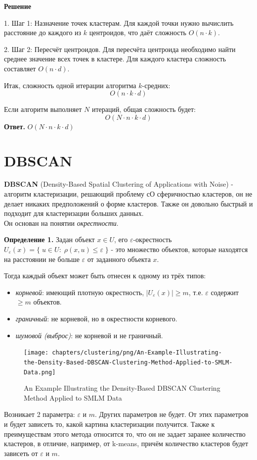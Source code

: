 \textbf{Решение}

1. Шаг 1: Назначение точек кластерам.
   Для каждой точки нужно вычислить расстояние до каждого из \(k\) центроидов, что даёт сложность \(O(n \cdot k)\).

2. Шаг 2: Пересчёт центроидов.
   Для пересчёта центроида необходимо найти среднее значение всех точек в кластере. Для каждого кластера сложность составляет \(O(n \cdot d)\).

Итак, сложность одной итерации алгоритма \(k\)-средних: 
\[
O(n \cdot k \cdot d)
\]

Если алгоритм выполняет \(N\) итераций, общая сложность будет:
\[
O(N \cdot n \cdot k \cdot d)
\]
\textbf{Ответ.} $O(N \cdot n \cdot k \cdot d)$


\section{DBSCAN}

\textbf{DBSCAN} (Density-Based Spatial Clustering of Applications with Noise) - алгоритм кластеризации, решающий проблему сО сферичностью кластеров, он не делает никаких предположений о форме кластеров. Также он довольно быстрый и подходит для кластеризации больших данных.
\\
Он основан на понятии {\textit{окрестности}}.

\textbf{Определение 1.} Задан объект $x \in U$, его $\varepsilon$-окрестность $U_\varepsilon (x) = \{\;u\in U:\; \rho (x,u) \leq \varepsilon \;\}$ - это множество объектов, которые находятся на расстоянии не больше $\varepsilon$ от заданного объекта $x$.

\newcommand{\abs}[1]{\left|#1\right|}

Тогда каждый объект может быть отнесен к одному из трёх типов:
\begin{itemize}
    \item \textit{корневой}: имеющий плотную окрестность,  {$\abs{U_\varepsilon (x)} \geq m$}, т.е. $\varepsilon$ содержит $\geq m$ объектов.
    \item \textit{граничный}: не корневой, но в окрестности корневого.
    \item \textit{шумовой (выброс)}: не корневой и не граничный.
\end{itemize}
\begin{figure}[h!]
    \centering
    \texttt{[image: chapters/clustering/png/An-Example-Illustrating-the-Density-Based-DBSCAN-Clustering-Method-Applied-to-SMLM-Data.png]}
    \caption{An Example Illustrating the Density-Based DBSCAN Clustering Method Applied to SMLM Data}
    \label{fig:enter-label-2}
\end{figure}
Возникает 2 параметра: $\varepsilon$ и $m$. Других параметров не будет. От этих параметров и будет зависеть то, какой картина кластеризации получится. Также к преимуществам этого метода относится то, что он не задает заранее количество кластеров, в отличие, например, от k-means, причём количество кластеров будет зависеть от $\varepsilon$ и $m$. 

